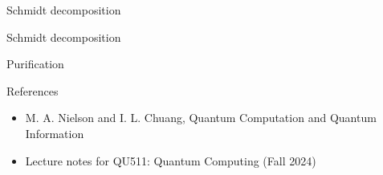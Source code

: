 \documentclass[9pt]{beamer}
\begin{document}
    \begin{section}{Schmidt decomposition}
        \begin{frame}{Schmidt decomposition}
        \end{frame}

        \begin{frame}{Purification}
        \end{frame}
    \end{section}

    \begin{frame}{References}
        
        \begin{itemize}
            \item M. A. Nielson and I. L. Chuang, Quantum Computation and Quantum Information
            \item Lecture notes for QU511: Quantum Computing (Fall 2024)
        \end{itemize}
        \vspace{6cm}
    \end{frame}
\end{document}
